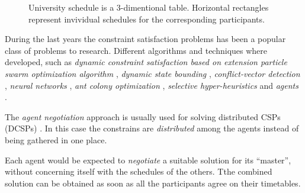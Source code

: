\begin{figure}
  \label{fig:ScheduleSpace}
  
  \caption{University schedule is a 3-dimentional table. Horizontal rectangles
           represent invividual schedules for the corresponding participants.
          }
\end{figure}

\noindent
During the last years the constraint satisfaction problems has been a popular
class of problems to research. Different algorithms and techniques where developed,
such as
\emph{dynamic constraint satisfaction based on extension particle swarm
      optimization algorithm} \cite{CSPswarm},
\emph{dynamic state bounding} \cite{CSPdynStateBound},
\emph{conflict-vector detection} \cite{CSPtimetable},
\emph{neural networks} \cite{CSPneuro},
\emph{ant colony optimization} \cite{CSPcunningACO, CSPlimmemACO},
\emph{selective hyper-heuristics} \cite{CSPhypHeur}
and \emph{agents} \cite{CSPagent2013, CSPagent2014, DCSPagent1998}.


The \emph{agent negotiation} approach is usually used for solving distributed
CSPs (DCSPs) \cite{DCSPagent1998, DCSP2013, CSPagent2014}.
In this case the constrains are \emph{distributed} among the agents instead of
being gathered in one place.

Each agent would be expected to \emph{negotiate} a suitable solution for its
``master'', without concerning itself with the schedules of the others.
Tthe combined solution can be obtained as soon as all the participants agree on
their timetables.
